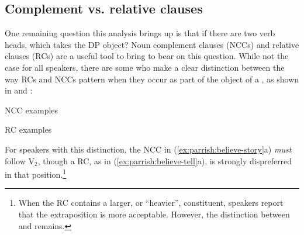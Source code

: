 \documentclass[output=paper,newtxmath,modfonts,nonflat,draftmode]{langsci/langscibook}
\begin{document}
\subsection{Complement vs. relative clauses}
One remaining question this analysis brings up is that if there are two verb heads, which takes the DP object? Noun complement clauses (NCCs) and relative clauses (RCs) are a useful tool to bring to bear on this question. While not the case for all speakers, there are some who make a clear distinction between the way RCs and NCCs pattern when they occur as part of the object of a , as shown in  and :

\pagebreak

\ea NCC examples

\z 
\label{ex:parrish:believe-story}
\z

\ea RC examples

\z 
\label{ex:parrish:believe-tell}
\z

For speakers with this distinction, the NCC in (\ref{ex:parrish:believe-story}a) \textit{must} follow V$_{2}$, though a RC, as in (\ref{ex:parrish:believe-tell}a), is strongly dispreferred in that position.\footnote{When the RC contains a larger, or ``heavier'', constituent, speakers report that the extraposition is more acceptable. However, the distinction between  and  remains.}
\end{document}

